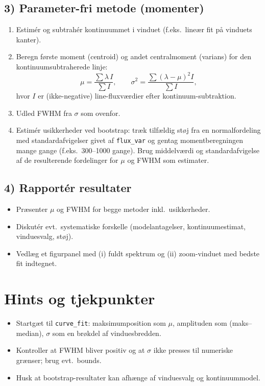 \documentclass[11pt,a4paper]{article}
\begin{document}
\subsection*{3) Parameter-fri metode (momenter)}
\begin{enumerate}
\item Estimér og subtrahér kontinuummet i vinduet (f.eks.\ lineær fit på vinduets kanter).
\item Beregn første moment (centroid) og andet centralmoment (varians) for den kontinuum\-subtraherede linje:
\[ \mu = \frac{\sum \lambda\, I}{\sum I}, \qquad
\sigma^2 = \frac{\sum (\lambda-\mu)^2 I}{\sum I}, \]
hvor $I$ er (ikke-negative) line-fluxværdier efter kontinuum-subtraktion.
\item Udled FWHM fra $\sigma$ som ovenfor.
\item Estimér usikkerheder ved bootstrap: træk tilfældig støj fra en normalfordeling med standardafvigelser givet af \texttt{flux\_var} og gentag momentberegningen mange gange (f.eks.\ 300--1000 gange). Brug middelværdi og standardafvigelse af de resulterende fordelinger for $\mu$ og FWHM som estimater.
\end{enumerate}

\subsection*{4) Rapportér resultater}
\begin{itemize}
\item Præsenter $\mu$ og FWHM for begge metoder inkl.\ usikkerheder.
\item Diskutér evt.\ systematiske forskelle (modelantagelser, kontinuumestimat, vinduesvalg, støj).
\item Vedlæg et figurpanel med (i) fuldt spektrum og (ii) zoom-vinduet med bedste fit indtegnet.
\end{itemize}

\section*{Hints og tjekpunkter}
\begin{itemize}
\item Startgæt til \texttt{curve\_fit}: maksimum\-position som $\mu$, amplituden som (maks--median), $\sigma$ som en brøkdel af vinduesbredden.
\item Kontroller at FWHM bliver positiv og at $\sigma$ ikke presses til numeriske grænser; brug evt.\ bounds.
\item Husk at bootstrap-resultater kan afhænge af vinduesvalg og kontinuum\-model.
\end{itemize}
\end{document}

